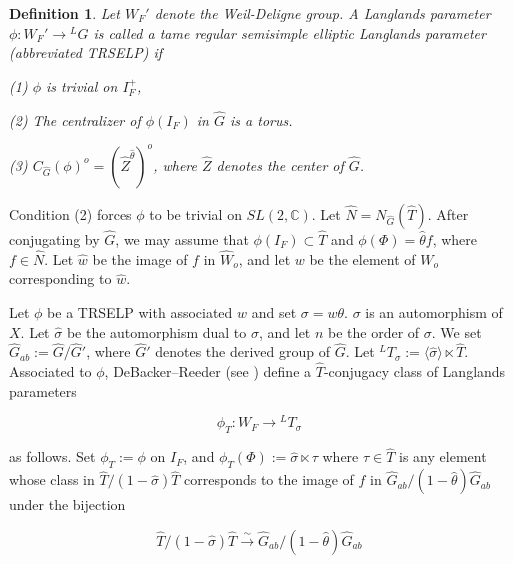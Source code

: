 \documentclass[11pt]{amsart}
\theoremstyle{plain}
\newtheorem{definition}[enumi]{Definition}
\begin{document}
\begin{definition}
Let $W_F'$ denote the Weil-Deligne group.  A Langlands parameter $\phi : W_F' \rightarrow {}^L G$ is called a \emph{tame regular semisimple elliptic Langlands parameter} (abbreviated TRSELP) if

(1) $\phi$ is trivial on $I_F^+$,

(2) The centralizer of $\phi(I_F)$ in $\hat{G}$ is a torus.

(3) $C_{\hat{G}}(\phi)^o = (\hat{Z}^{\hat{\theta}})^o$, where $\hat{Z}$ denotes the center of $\hat{G}$.
\end{definition}

Condition (2) forces $\phi$ to be trivial on $SL(2,\mathbb{C})$.  Let $\hat{N} = N_{\hat{G}}(\hat{T})$.  After conjugating by $\hat{G}$, we may assume that $\phi(I_F) \subset \hat{T}$ and $\phi(\Phi) = \hat{\theta} f$, where $f \in \hat{N}$.  Let $\hat{w}$ be the image of $f$ in $\hat{W}_o$, and let $w$ be the element of $W_o$ corresponding to $\hat{w}$.

Let $\phi$ be a TRSELP with associated $w$ and set $\sigma = w \theta$. $\sigma$ is an automorphism of $X$.  Let $\hat{\sigma}$ be the automorphism dual to $\sigma$, and let $n$ be the order of $\sigma$.  We set $\hat{G}_{ab} := \hat{G} / \hat{G}'$, where $\hat{G}'$ denotes the derived group of $\hat{G}$. Let ${}^L T_{\sigma} := \langle \hat{\sigma} \rangle \ltimes \hat{T}$.  Associated to $\phi$, DeBacker--Reeder (see \cite[Chapter 4]{debackerreeder}) define a $\hat{T}$-conjugacy class of Langlands parameters

\begin{equation}
\phi_T : W_F \rightarrow {}^L T_{\sigma} \ \label{phiT}
\end{equation}

\noindent as follows.  Set $\phi_T := \phi$ on $I_F$, and $\phi_T(\Phi) := \hat{\sigma} \ltimes \tau$ where $\tau \in \hat{T}$ is any element whose class in $\hat{T} / (1 - \hat{\sigma}) \hat{T}$ corresponds to the image of $f$ in $\hat{G}_{ab} / (1 - \hat{\theta}) \hat{G}_{ab}$ under the bijection

\begin{equation}
\hat{T} / (1 - \hat{\sigma}) \hat{T} \stackrel{\sim}{\rightarrow} \hat{G}_{ab} / (1 - \hat{\theta}) \hat{G}_{ab} \ \label{bijectionfortau}
\end{equation}
\end{document}
